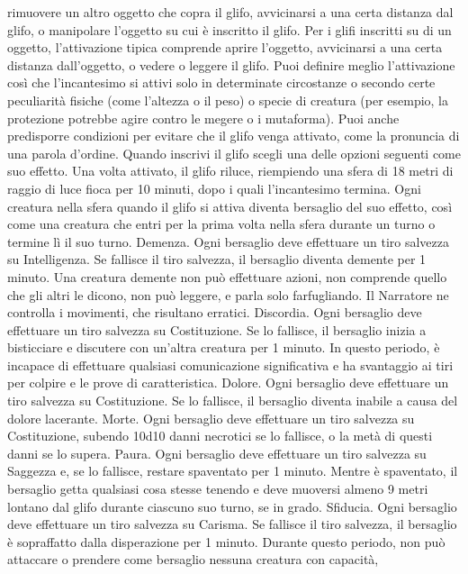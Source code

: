 \begin{multicols}{2}
rimuovere un altro oggetto che copra il glifo, avvicinarsi
a una certa distanza dal glifo, o manipolare l’oggetto su
cui è inscritto il glifo.
Per i glifi inscritti su di un oggetto, l’attivazione tipica
comprende aprire l’oggetto, avvicinarsi a una certa
distanza dall’oggetto, o vedere o leggere il glifo.
Puoi definire meglio l’attivazione così che l’incantesimo
si attivi solo in determinate circostanze o secondo certe
peculiarità fisiche (come l’altezza o il peso) o specie di
creatura (per esempio, la protezione potrebbe agire
contro le megere o i mutaforma). Puoi anche
predisporre condizioni per evitare che il glifo venga
attivato, come la pronuncia di una parola d’ordine.
Quando inscrivi il glifo scegli una delle opzioni seguenti
come suo effetto. Una volta attivato, il glifo riluce,
riempiendo una sfera di 18 metri di raggio di luce fioca
per 10 minuti, dopo i quali l’incantesimo termina. Ogni
creatura nella sfera quando il glifo si attiva diventa
bersaglio del suo effetto, così come una creatura che
entri per la prima volta nella sfera durante un turno o
termine lì il suo turno.
Demenza. Ogni bersaglio deve effettuare un tiro
salvezza su Intelligenza. Se fallisce il tiro salvezza, il
bersaglio diventa demente per 1 minuto. Una creatura
demente non può effettuare azioni, non comprende
quello che gli altri le dicono, non può leggere, e parla
solo farfugliando. Il Narratore ne controlla i movimenti, che
risultano erratici.
Discordia. Ogni bersaglio deve effettuare un tiro
salvezza su Costituzione. Se lo fallisce, il bersaglio
inizia a bisticciare e discutere con un’altra creatura per
1 minuto. In questo periodo, è incapace di effettuare
qualsiasi comunicazione significativa e ha svantaggio ai
tiri per colpire e le prove di caratteristica.
Dolore. Ogni bersaglio deve effettuare un tiro salvezza
su Costituzione. Se lo fallisce, il bersaglio diventa
inabile a causa del dolore lacerante.
Morte. Ogni bersaglio deve effettuare un tiro salvezza
su Costituzione, subendo 10d10 danni necrotici se lo
fallisce, o la metà di questi danni se lo supera.
Paura. Ogni bersaglio deve effettuare un tiro salvezza
su Saggezza e, se lo fallisce, restare spaventato per 1
minuto. Mentre è spaventato, il bersaglio getta qualsiasi
cosa stesse tenendo e deve muoversi almeno 9 metri
lontano dal glifo durante ciascuno suo turno, se in
grado.
Sfiducia. Ogni bersaglio deve effettuare un tiro
salvezza su Carisma. Se fallisce il tiro salvezza, il
bersaglio è sopraffatto dalla disperazione per 1 minuto.
Durante questo periodo, non può attaccare o prendere
come bersaglio nessuna creatura con capacità,

\end{multicols}
